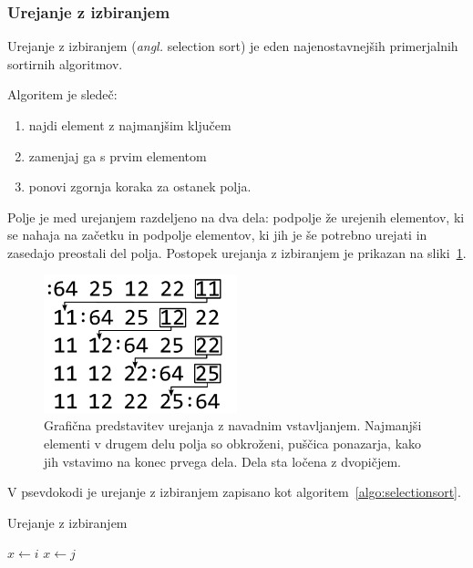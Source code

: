 \documentclass[a4paper,oneside,12pt]{article}
\begin{document}
\subsubsection{Urejanje z izbiranjem}
\label{chapter:selectionsort}
Urejanje z izbiranjem (\emph{angl.} selection sort) je eden najenostavnejših primerjalnih sortirnih
algoritmov.

Algoritem je sledeč:
\begin{enumerate}
  \item najdi element z najmanjšim ključem
  \item zamenjaj ga s prvim elementom
  \item ponovi zgornja koraka za ostanek polja.
\end{enumerate}

Polje je med urejanjem razdeljeno na dva dela: podpolje že urejenih elementov, ki se
nahaja na začetku in podpolje elementov, ki jih je še potrebno urejati in zasedajo
preostali del polja. Postopek urejanja z izbiranjem je prikazan na sliki~\ref{fig:selectionsortimage}.

\begin{figure}[ht]
    \begin{center}
        \includegraphics[height=40mm]{slike/selectionsort.pdf}
    \end{center}
    \vspace{-0.7cm}
    \caption[Urejanje z izbiranjem]{Grafična predstavitev urejanja z navadnim vstavljanjem.
Najmanjši elementi v drugem delu polja so obkroženi, puščica ponazarja, kako jih
vstavimo na konec prvega dela. Dela sta ločena z dvopičjem.}
    \label{fig:selectionsortimage}
\end{figure}

V psevdokodi je urejanje z izbiranjem zapisano kot algoritem~\ref{algo:selectionsort}.

\begin{algorithm}[h!t!]
  \caption{Urejanje z izbiranjem}\label{algo:selectionsort}
  \begin{algorithmic}[1]
            \State $x \gets i$
                    \State $x \gets j$
                \EndIf
            \EndFor
        \EndFor
    \EndFunction
  \end{algorithmic}
\end{algorithm}
\end{document}
